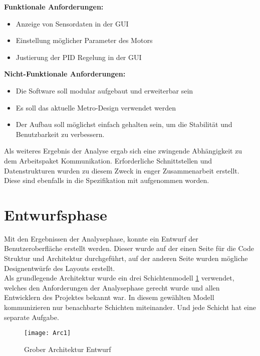 \begin{minipage}[t]{0.4\textwidth}
\textbf{Funktionale Anforderungen:}
\begin{itemize}
	\item Anzeige von Sensordaten in der GUI
	\item Einstellung möglicher Parameter des Motors
	\item Justierung der PID Regelung in der GUI
	\end{itemize} 
\end{minipage}\hfill\begin{minipage}[t]{0.5\textwidth}
\textbf{Nicht-Funktionale Anforderungen:}
\begin{itemize}
	\item Die Software soll modular aufgebaut und erweiterbar sein
	\item Es soll das aktuelle Metro-Design verwendet werden
	\item Der Aufbau soll möglichst einfach gehalten sein, um die Stabilität und Benutzbarkeit zu verbessern.
\end{itemize} 
\end{minipage}
\newline
\newline
\newline
Als weiteres Ergebnis der Analyse ergab sich eine zwingende Abhängigkeit zu dem Arbeitspaket Kommunikation.  Erforderliche Schnittstellen und Datenstrukturen wurden zu diesem Zweck in enger Zusammenarbeit erstellt. Diese sind ebenfalls in die Spezifikation mit aufgenommen worden.
\section{Entwurfsphase}
Mit den Ergebnissen der Analysephase, konnte ein Entwurf der Benutzeroberfläche erstellt werden. Dieser wurde auf der einen Seite für die Code Struktur und Architektur durchgeführt, auf der anderen Seite wurden mögliche Designentwürfe des Layouts erstellt.\\

Als grundlegende Architektur wurde ein drei Schichtenmodell \ref{fig:arc} verwendet, welches den Anforderungen der Analysephase gerecht wurde und allen Entwicklern des Projektes bekannt war. In diesem gewählten Modell kommunizieren nur benachbarte Schichten miteinander. Und jede Schicht hat eine separate Aufgabe.

\begin{figure}[ht]
	\centering
		\texttt{[image: Arc1]}
		\caption{Grober Architektur Entwurf}
		\label{fig:arc}
\end{figure}

